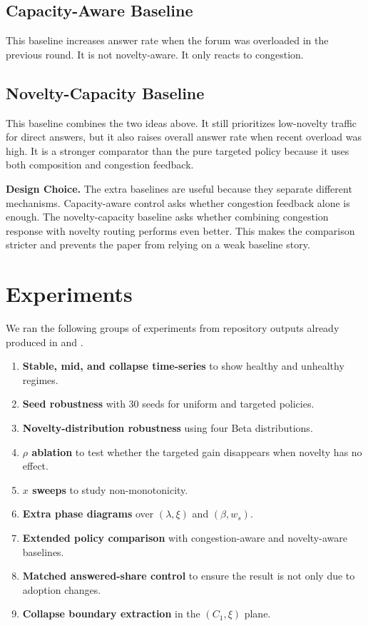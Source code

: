 \documentclass{article}
\newenvironment{designchoice}
  {\begin{framed}\noindent\textbf{Design Choice. }}
  {\end{framed}}
\begin{document}
\subsection{Capacity-Aware Baseline}
This baseline increases answer rate when the forum was overloaded in the previous round. It is not novelty-aware. It only reacts to congestion.

\subsection{Novelty-Capacity Baseline}
This baseline combines the two ideas above. It still prioritizes low-novelty traffic for direct answers, but it also raises overall answer rate when recent overload was high. It is a stronger comparator than the pure targeted policy because it uses both composition and congestion feedback.

\begin{designchoice}
The extra baselines are useful because they separate different mechanisms. Capacity-aware control asks whether congestion feedback alone is enough. The novelty-capacity baseline asks whether combining congestion response with novelty routing performs even better. This makes the comparison stricter and prevents the paper from relying on a weak baseline story.
\end{designchoice}

\section{Experiments}
We ran the following groups of experiments from repository outputs already produced in
 and .

\begin{enumerate}[leftmargin=1.5em]
\item \textbf{Stable, mid, and collapse time-series} to show healthy and unhealthy regimes.
\item \textbf{Seed robustness} with 30 seeds for uniform and targeted policies.
\item \textbf{Novelty-distribution robustness} using four Beta distributions.
\item \textbf{$\rho$ ablation} to test whether the targeted gain disappears when novelty has no effect.
\item \textbf{$x$ sweeps} to study non-monotonicity.
\item \textbf{Extra phase diagrams} over $(\lambda,\xi)$ and $(\beta,w_s)$.
\item \textbf{Extended policy comparison} with congestion-aware and novelty-aware baselines.
\item \textbf{Matched answered-share control} to ensure the result is not only due to adoption changes.
\item \textbf{Collapse boundary extraction} in the $(C_1,\xi)$ plane.
\end{enumerate}
\end{document}
